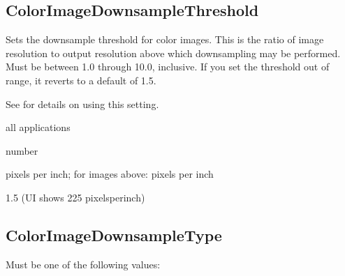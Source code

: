 \documentclass[letterpaper,12pt,english,openany,oneside]{sphinxmanual}
\begin{document}
\subsection{ColorImageDownsampleThreshold}
\label{\detokenize{PDF_Create_CommonSettings:colorimagedownsamplethreshold}}
Sets the downsample threshold for color images. This is the ratio of image resolution to output resolution above which downsampling may be performed. Must be between 1.0 through 10.0, inclusive. If you set the threshold out of range, it reverts to a default of 1.5.

See  for details on using this setting.

\label{\detokenize{PDF_Create_CommonSettings:supported-by-23}}

all applications

\label{\detokenize{PDF_Create_CommonSettings:type-23}}

number

\label{\detokenize{PDF_Create_CommonSettings:ui-name-17}}

pixels per inch; for images above:  pixels per inch

\label{\detokenize{PDF_Create_CommonSettings:default-value-20}}

1.5 (UI shows 225 pixels\sphinxhyphen{}per\sphinxhyphen{}inch)




\subsection{ColorImageDownsampleType}
\label{\detokenize{PDF_Create_CommonSettings:colorimagedownsampletype}}
Must be one of the following values:
\end{document}
